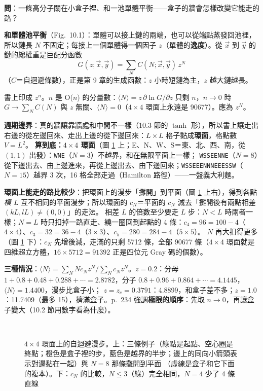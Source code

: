 \textbf{問}：一條高分子關在小盒子裡、和一池單體平衡——盒子的牆會怎樣改變它能走的路？

\textbf{和單體池平衡}（Fig.~10.1）：單體可以接上鏈的兩端，也可以從端點蒸發回池裡，所以鏈長 $N$ 不固定；每接上一個單體得一個因子 $z$（單體的\textbf{逸度}）。從 $\vec x$ 到 $\vec y$ 的鏈的總權重是巨配分函數
\[G(z;\vec x,\vec y)=\sum_NC(N;\vec x,\vec y)\,z^N\tag{10.1}\]
（$C$＝自迴避條數），正是第 9 章的生成函數：$z$ 小時短鏈為主，$z$ 越大鏈越長。
\begin{errbox}[p.~235，(10.1)]
書上印成 $z^n$。$n$ 是 O($n$) 的分量數：$\langle N\rangle=z\,\partial\ln G/\partial z$ 只剩 $n$，$n\to0$ 時 $G\to\sum_NC(N)$ 與 $z$ 無關、$\langle N\rangle=0$（$4\times4$ 環面上永遠是 90677）。應為 $z^N$。
\end{errbox}

\textbf{週期邊界}：真的牆讓靠牆處和中間不一樣（10.3 節的 $\tanh$ 形），所以書上讓走出右邊的從左邊回來、走出上邊的從下邊回來：$L\times L$ 格子黏成\textbf{環面}，格點數 $V=L^2$。
\textbf{算到底：$4\times4$ 環面}（圖 \ref{ten-fig-torus} 上；E、N、W、S＝東、北、西、南，從 $(1,1)$ 出發）：\texttt{WNE}（$N=3$）不越界，和在無限平面上一樣；
\texttt{WSSEENNE}（$N=8$）從下邊出去、由上邊進來，再從上邊出去、由下邊回來；\texttt{WSSEEENNNEEESSW}（$N=15$）越界 3 次，16 格全部走過（Hamilton 路徑）——一盤義大利麵。

\textbf{環面上能走的路比較少}：把環面上的漫步「攤開」到平面（圖 \ref{ten-fig-torus} 上右），得到各點\emph{模 $L$} 互不相同的平面漫步；所以環面的 $c_N$＝平面的 $c_N$ 減去「攤開後有兩點相差 $(kL,lL)\ne(0,0)$」的走法。
相差 $L$ 的倍數至少要走 $L$ 步：$N<L$ 時兩者一樣；$N=L$ 時只扣掉一路直走、繞一圈回到起點的 4 條：$c_4=96=100-4$（$4\times4$）、$c_3=32=36-4$（$3\times3$）、$c_5=280=284-4$（$5\times5$）。
$N$ 再大扣得更多（圖 \ref{ten-fig-torus} 下）：$c_N$ 先增後減，走滿的只剩 5712 條，全部 90677 條（$4\times4$ 環面就是四維超立方體，$16\times5712=91392$ 正是四位元 Gray 碼的個數）。

\textbf{三種情況}：$\langle N\rangle=\sum_NNc_Nz^N\big/\sum_Nc_Nz^N$。$z=0.2$：分母 $1+0.8+0.48+0.288+\cdots=2.8782$，分子 $0.8+0.96+0.864+\cdots=4.1445$，$\langle N\rangle=1.4400$，漫步比盒子小；
$z=z_c=0.3791$：4.8899，和盒子差不多；$z=1.0$：11.7409（最多 15），擠滿盒子。p.~234 強調\textbf{極限的順序}：先取 $n\to0$，再讓盒子變大（10.2 節用數字看為什麼）。

\begin{figure}[htbp]
\centering
\TenFigTorus\\[6pt]
{\footnotesize\setlength{\tabcolsep}{4pt}\TenTabTorus}
\caption{$4\times4$ 環面上的自迴避漫步。上：三條例子（綠點是起點、空心圈是終點；橙色是盒子裡的步，藍色是越界的半步；邊上的同向小箭頭表示對邊黏在一起）與 $N=8$ 那條攤開到平面
（虛線是盒子和它下面的複本）。下：$c_N$ 的比較，$N\le3$（綠）完全相同，$N=4$ 少了 4 條直線}\label{ten-fig-torus}
\end{figure}

